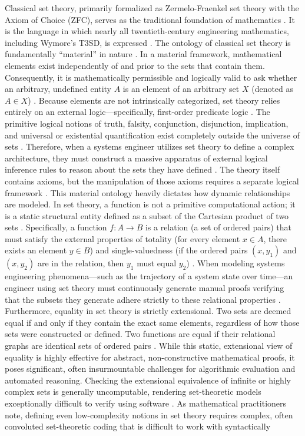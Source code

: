 \documentclass[11pt]{article}
\begin{document}
Classical set theory, primarily formalized as Zermelo-Fraenkel set theory with the Axiom of Choice (ZFC), serves as the traditional foundation of mathematics \parencite{Ref16}. It is the language in which nearly all twentieth-century engineering mathematics, including Wymore's T3SD, is expressed \parencite{Ref11}. The ontology of classical set theory is fundamentally ``material'' in nature \parencite{Ref18}. In a material framework, mathematical elements exist independently of and prior to the sets that contain them. Consequently, it is mathematically permissible and logically valid to ask whether an arbitrary, undefined entity $A$ is an element of an arbitrary set $X$ (denoted as $A \in X$) \parencite{Ref18}. Because elements are not intrinsically categorized, set theory relies entirely on an external logic---specifically, first-order predicate logic \parencite{Ref23}. The primitive logical notions of truth, falsity, conjunction, disjunction, implication, and universal or existential quantification exist completely outside the universe of sets \parencite{Ref23}. Therefore, when a systems engineer utilizes set theory to define a complex architecture, they must construct a massive apparatus of external logical inference rules to reason about the sets they have defined \parencite{Ref23}. The theory itself contains axioms, but the manipulation of those axioms requires a separate logical framework \parencite{Ref16, Ref26}. This material ontology heavily dictates how dynamic relationships are modeled. In set theory, a function is not a primitive computational action; it is a static structural entity defined as a subset of the Cartesian product of two sets \parencite{Ref23}. Specifically, a function $f: A \to B$ is a relation (a set of ordered pairs) that must satisfy the external properties of totality (for every element $x \in A$, there exists an element $y \in B$) and single-valuedness (if the ordered pairs $(x, y_1)$ and $(x, y_2)$ are in the relation, then $y_1$ must equal $y_2$) \parencite{Ref23, Ref23}. When modeling systems engineering phenomena---such as the trajectory of a system state over time---an engineer using set theory must continuously generate manual proofs verifying that the subsets they generate adhere strictly to these relational properties \parencite{Ref27}. Furthermore, equality in set theory is strictly extensional. Two sets are deemed equal if and only if they contain the exact same elements, regardless of how those sets were constructed or defined. Two functions are equal if their relational graphs are identical sets of ordered pairs \parencite{Ref23}. While this static, extensional view of equality is highly effective for abstract, non-constructive mathematical proofs, it poses significant, often insurmountable challenges for algorithmic evaluation and automated reasoning. Checking the extensional equivalence of infinite or highly complex sets is generally uncomputable, rendering set-theoretic models exceptionally difficult to verify using software \parencite{Ref15, Ref16, Ref17}. As mathematical practitioners note, defining even low-complexity notions in set theory requires complex, often convoluted set-theoretic coding that is difficult to work with syntactically 
\end{document}
